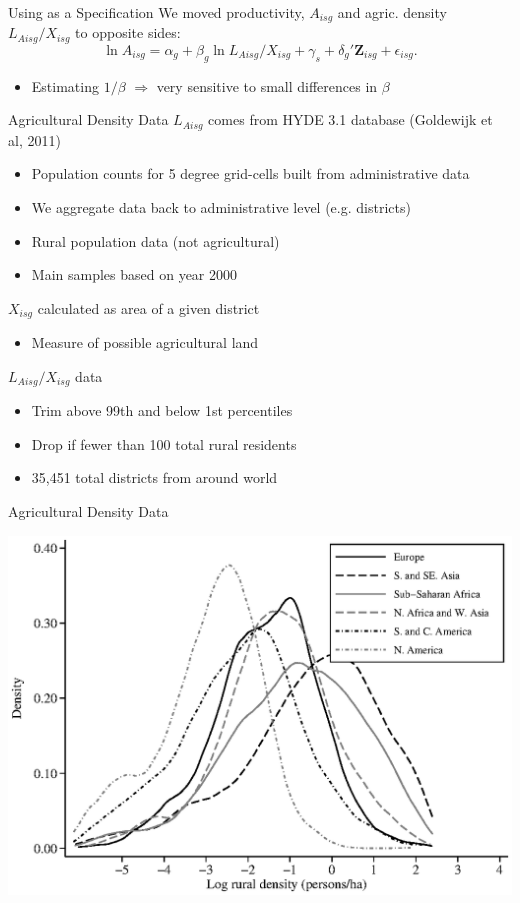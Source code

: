 \documentclass[10pt, xcolor=dvipsnames]{beamer}
\begin{document}
\begin{frame}{Using as a Specification}
We moved productivity, $A_{isg}$ and agric. density $L_{Aisg}/X_{isg}$ to opposite sides:
\begin{equation}
  \ln A_{isg} = \alpha_g + \beta_g \ln L_{Aisg}/X_{isg} + \gamma_{s} + \delta_g' \mathbf{Z}_{isg} + \epsilon_{isg}. \label{EQ_regress}
\end{equation}

\begin{itemize}
  \item Estimating $1/\beta$ $\Rightarrow$ very sensitive to small differences in $\beta$
\end{itemize}
\end{frame}

\begin{frame}{Agricultural Density Data}
$L_{Aisg}$ comes from HYDE 3.1 database (Goldewijk et al, 2011)
\begin{itemize}
  \item Population counts for 5 degree grid-cells built from administrative data
  \item We aggregate data back to administrative level (e.g. districts)
  \item Rural population data (not agricultural)
  \item Main samples based on year 2000
\end{itemize}
$X_{isg}$ calculated as area of a given district
\begin{itemize}
  \item Measure of possible agricultural land
\end{itemize}
$L_{Aisg}/X_{isg}$ data 
\begin{itemize}
  \item Trim above 99th and below 1st percentiles
  \item Drop if fewer than 100 total rural residents
  \item 35,451 total districts from around world
\end{itemize}
\end{frame}

\begin{frame}{Agricultural Density Data}
\begin{center}
\includegraphics[width=.8\textwidth]{fig_dens_rurd.eps}
\end{center}
\end{frame}
\end{document}
